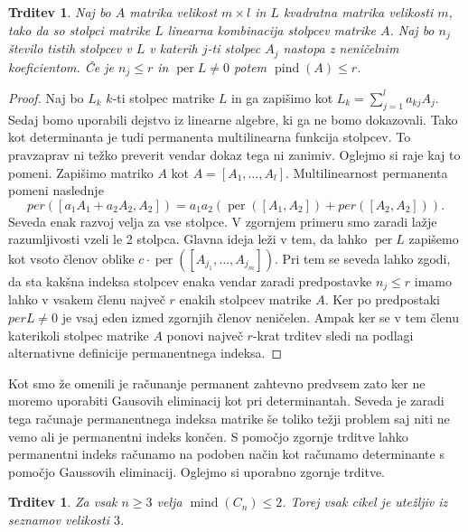 \documentclass[12pt,a4paper,twoside]{article}
\theoremstyle{definition} %
\theoremstyle{plain} %
\newtheorem{trditev}[definicija]{Trditev}
\numberwithin{equation}{section}  %
\DeclareMathOperator{\per}{per}
\DeclareMathOperator{\mind}{mind}
\DeclareMathOperator{\pind}{pind}
\begin{document}
\begin{trditev}
\label{pind}
Naj bo $A$ matrika velikost $m \times l$ in $L$ kvadratna matrika velikosti $m$, tako da so stolpci matrike $L$ linearna kombinacija stolpcev matrike $A$. Naj bo $n_j$ število tistih stolpcev v $L$ v katerih $j$-ti stolpec $A_j$ nastopa z neničelnim koeficientom. Če je $n_j \le r$ in $\per L \neq 0$ potem $\pind (A) \le r$.
\end{trditev}
\begin{proof}
Naj bo $L_k$ $k$-ti stolpec matrike $L$ in ga zapišimo kot $L_k = \sum_{j=1}^l a_{kj}A_j$. Sedaj bomo uporabili dejstvo iz linearne algebre, ki ga ne bomo dokazovali. Tako kot determinanta je tudi permanenta multilinearna funkcija stolpcev. To pravzaprav ni težko preverit vendar dokaz tega ni zanimiv. Oglejmo si raje kaj to pomeni. Zapišimo matriko $A$ kot $A = [A_1, \ldots, A_l]$. Multilinearnost permanenta pomeni naslednje
$$ per([a_1A_1 + a_2A_2, A_2]) = a_1 a_2 \left( \per([A_1, A_2]) + per([A_2, A_2]) \right).$$
Seveda enak razvoj velja za vse stolpce. V zgornjem primeru smo zaradi lažje razumljivosti vzeli le 2 stolpca. Glavna ideja leži v tem, da lahko $\per L$ zapišemo kot vsoto členov oblike $c \cdot \per([A_{j_1}, \dots, A_{j_m}])$. Pri tem se seveda lahko zgodi, da sta kakšna indeksa stolpcev enaka vendar zaradi predpostavke $n_j \le r$ imamo lahko v vsakem členu največ $r$ enakih stolpcev matrike $A$. Ker po predpostaki $perL \neq 0$ je vsaj eden izmed zgornjih členov neničelen. Ampak ker se v tem členu katerikoli stolpec matrike $A$ ponovi največ $r$-krat trditev sledi na podlagi alternativne definicije permanentnega indeksa.
\end{proof}

Kot smo že omenili je računanje permanent zahtevno predvsem zato ker ne moremo uporabiti Gausovih eliminacij kot pri determinantah. Seveda je zaradi tega računaje permanentnega indeksa matrike še toliko težji problem saj niti ne vemo ali je permanentni indeks končen. S pomočjo zgornje trditve lahko permanentni indeks računamo na podoben način kot računamo determinante s pomočjo  Gaussovih eliminacij. Oglejmo si uporabno zgornje trditve.

\begin{trditev}
Za vsak $n \ge 3$ velja $\mind(C_n) \le 2$. Torej vsak cikel je utežljiv iz seznamov velikosti $3$.
\end{trditev}
\end{document}
